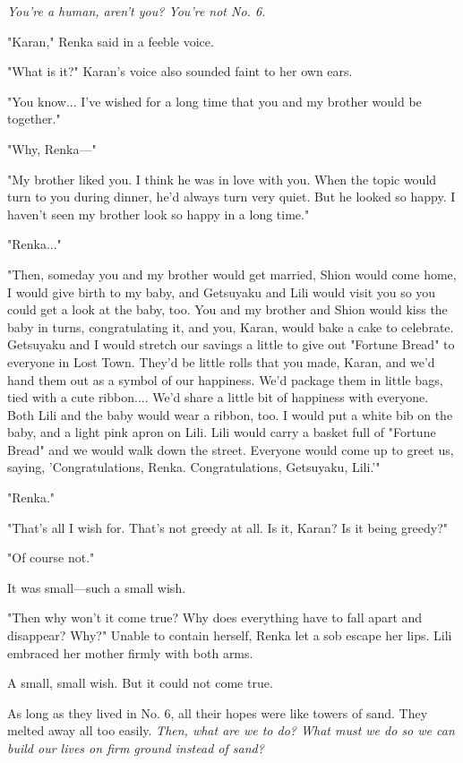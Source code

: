 \emph{You're a human, aren't you? You're not No. 6.}

"Karan," Renka said in a feeble voice.

"What is it?" Karan's voice also sounded faint to her own ears.

"You know... I've wished for a long time that you and my brother would
be together."

"Why, Renka---"

"My brother liked you. I think he was in love with you. When the topic
would turn to you during dinner, he'd always turn very quiet. But he
looked so happy. I haven't seen my brother look so happy in a long
time."

"Renka..."

"Then, someday you and my brother would get married, Shion would come
home, I would give birth to my baby, and Getsuyaku and Lili would visit
you so you could get a look at the baby, too. You and my brother and
Shion would kiss the baby in turns, congratulating it, and you, Karan,
would bake a cake to celebrate. Getsuyaku and I would stretch our
savings a little to give out "Fortune Bread" to everyone in Lost Town.
They'd be little rolls that you made, Karan, and we'd hand them out as a
symbol of our happiness. We'd package them in little bags, tied with a
cute ribbon.... We'd share a little bit of happiness with everyone. Both
Lili and the baby would wear a ribbon, too. I would put a white bib on
the baby, and a light pink apron on Lili. Lili would carry a basket full
of "Fortune Bread" and we would walk down the street. Everyone would
come up to greet us, saying, 'Congratulations, Renka. Congratulations,
Getsuyaku, Lili.'"

"Renka."

"That's all I wish for. That's not greedy at all. Is it, Karan? Is it
being greedy?"

"Of course not."

It was small---such a small wish.

"Then why won't it come true? Why does everything have to fall apart and
disappear? Why?" Unable to contain herself, Renka let a sob escape her
lips. Lili embraced her mother firmly with both arms.

A small, small wish. But it could not come true.

\mybreak

As long as they lived in No. 6, all their hopes were like towers of
sand. They melted away all too easily. \emph{Then, what are we to do? What
must we do so we can build our lives on firm ground instead of sand?}

